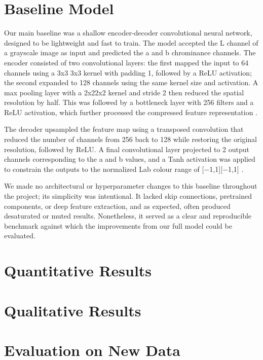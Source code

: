 \documentclass{article} %
\begin{document}
\section{Baseline Model}
\label{baseline}

Our main baseline was a shallow encoder-decoder convolutional neural network, designed to be lightweight and fast to train. The model accepted the L channel of a grayscale image as 
input and predicted the a and b chrominance channels. The encoder consisted of two convolutional layers: the first mapped the input to 64 channels using a 3x3 3x3 kernel with padding 1, 
followed by a ReLU activation; the second expanded to 128 channels using the same kernel size and activation. A max pooling layer with a 2x22x2 kernel and stride 2 then reduced the 
spatial resolution by half. This was followed by a bottleneck layer with 256 filters and a ReLU activation, which further processed the compressed feature representation \citep{leatvanich2025image}.

The decoder upsampled the feature map using a transposed convolution that reduced the number of channels from 256 back to 128 while restoring the original resolution, followed by ReLU. 
A final convolutional layer projected to 2 output channels corresponding to the a and b values, and a Tanh activation was applied to constrain the outputs to the normalized Lab colour 
range of [−1,1][−1,1] \citep{rosebrock2019bwcolorization}.

We made no architectural or hyperparameter changes to this baseline throughout the project; its simplicity was intentional. It lacked skip connections, pretrained components, or deep 
feature extraction, and as expected, often produced desaturated or muted results. Nonetheless, it served as a clear and reproducible benchmark against which the improvements from our 
full model could be evaluated.

\section{Quantitative Results}
\label{quant_results}

\section{Qualitative Results}
\label{qual_results}

\section{Evaluation on New Data}
\label{new_data}
\end{document}
